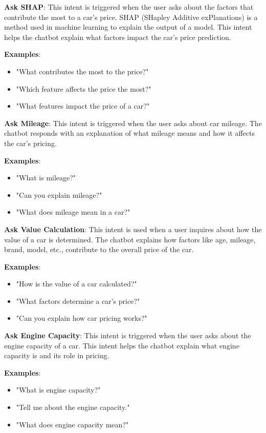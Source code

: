 \documentclass[a4paper,12pt]{article}
\begin{document}
\textbf{Ask SHAP}: This intent is triggered when the user asks about the factors that contribute the most to a car’s price. SHAP (SHapley Additive exPlanations) is a method used in machine learning to explain the output of a model. This intent helps the chatbot explain what factors impact the car's price prediction.

\textbf{Examples}:
\begin{itemize}
    \item "What contributes the most to the price?"
    \item "Which feature affects the price the most?"
    \item "What features impact the price of a car?"
\end{itemize}

\textbf{Ask Mileage}: This intent is triggered when the user asks about car mileage. The chatbot responds with an explanation of what mileage means and how it affects the car's pricing.

\textbf{Examples}:
\begin{itemize}
    \item "What is mileage?"
    \item "Can you explain mileage?"
    \item "What does mileage mean in a car?"
\end{itemize}

\textbf{Ask Value Calculation}: This intent is used when a user inquires about how the value of a car is determined. The chatbot explains how factors like age, mileage, brand, model, etc., contribute to the overall price of the car.

\textbf{Examples}:
\begin{itemize}
    \item "How is the value of a car calculated?"
    \item "What factors determine a car's price?"
    \item "Can you explain how car pricing works?"
\end{itemize}

\textbf{Ask Engine Capacity}: This intent is triggered when the user asks about the engine capacity of a car. This intent helps the chatbot explain what engine capacity is and its role in pricing.

\textbf{Examples}:
\begin{itemize}
    \item "What is engine capacity?"
    \item "Tell me about the engine capacity."
    \item "What does engine capacity mean?"
\end{itemize}
\end{document}
